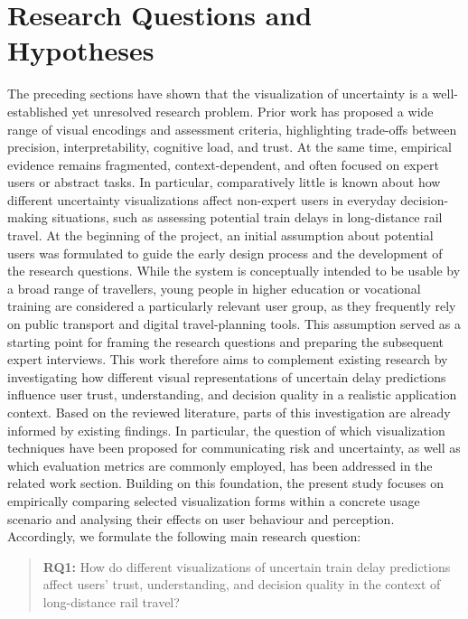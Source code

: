 \documentclass[final,journal,a4paper]{IEEEtran}
\begin{document}
\section{Research Questions and Hypotheses} \label{Research Questions and Hypotheses}
The preceding sections have shown that the visualization of uncertainty is a well-established yet unresolved research problem. Prior work has proposed a wide range of visual encodings and assessment criteria, highlighting trade-offs between precision, interpretability, cognitive load, and trust. At the same time, empirical evidence remains fragmented, context-dependent, and often focused on expert users or abstract tasks. In particular, comparatively little is known about how different uncertainty visualizations affect non-expert users in everyday decision-making situations, such as assessing potential train delays in long-distance rail travel.
\newline
At the beginning of the project, an initial assumption about potential users was formulated to guide the early design process and the development of the research questions. While the system is conceptually intended to be usable by a broad range of travellers, young people in higher education or vocational training are considered a particularly relevant user group, as they frequently rely on public transport and digital travel-planning tools. This assumption served as a starting point for framing the research questions and preparing the subsequent expert interviews.
\newline
This work therefore aims to complement existing research by investigating how different visual representations of uncertain delay predictions influence user trust, understanding, and decision quality in a realistic application context. Based on the reviewed literature, parts of this investigation are already informed by existing findings. In particular, the question of which visualization techniques have been proposed for communicating risk and uncertainty, as well as which evaluation metrics are commonly employed, has been addressed in the related work section. Building on this foundation, the present study focuses on empirically comparing selected visualization forms within a concrete usage scenario and analysing their effects on user behaviour and perception. Accordingly, we formulate the following main research question:

\begin{quote}
\hypertarget{rq:1}{}\textbf{RQ1:} How do different visualizations of uncertain train delay predictions affect users’ trust, understanding, and decision quality in the context of long-distance rail travel?
\end{quote}
\end{document}
